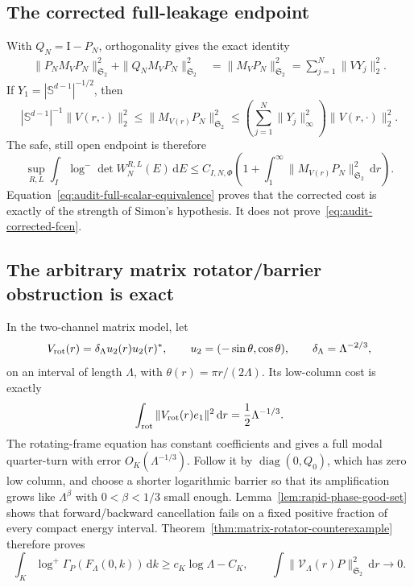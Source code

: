 \documentclass[11pt]{article}
\newcommand{\Sd}{\mathbb S^{d-1}}
\newcommand{\HS}{\mathfrak S_2}
\newcommand{\Id}{\mathrm I}
\newcommand{\dd}{\,\mathrm d}
\DeclareMathOperator{\diag}{diag}
\theoremstyle{definition}
\theoremstyle{remark}
\begin{document}
\subsection{The corrected full-leakage endpoint}

With $Q_N=\Id-P_N$, orthogonality gives the exact identity
\begin{align}
 \|P_NM_VP_N\|_{\HS}^2+\|Q_NM_VP_N\|_{\HS}^2
 &=\|M_VP_N\|_{\HS}^2
 =\sum_{j=1}^N\|VY_j\|_2^2.
 \label{eq:audit-full-leakage}
\end{align}
If $Y_1=|\Sd|^{-1/2}$, then
\begin{equation}
 |\Sd|^{-1}\|V(r,\cdot)\|_2^2
 \leq\|M_{V(r)}P_N\|_{\HS}^2
 \leq\left(\sum_{j=1}^N\|Y_j\|_\infty^2\right)
 \|V(r,\cdot)\|_2^2.
 \label{eq:audit-full-scalar-equivalence}
\end{equation}
The safe, still open endpoint is therefore
\begin{equation}
 \sup_{R,L}\int_I\log^-\det W_N^{R,L}(E)\dd E
 \leq C_{I,N,\Phi}
 \left(1+\int_1^\infty\|M_{V(r)}P_N\|_{\HS}^2\dd r\right).
 \label{eq:audit-corrected-fcen}
\end{equation}
Equation~\eqref{eq:audit-full-scalar-equivalence} proves that the corrected cost is exactly of the strength of Simon's hypothesis.  It does not prove~\eqref{eq:audit-corrected-fcen}.

\subsection{The arbitrary matrix rotator/barrier obstruction is exact}

In the two-channel matrix model, let
\begin{equation}
 V_{\rm rot}(r)=\delta_\Lambda u_2(r)u_2(r)^*,
 \qquad
 u_2=(-\sin\theta,\cos\theta),
 \qquad
 \delta_\Lambda=\Lambda^{-2/3},
 \label{eq:audit-rotator}
\end{equation}
on an interval of length $\Lambda$, with
$\theta(r)=\pi r/(2\Lambda)$.  Its low-column cost is exactly
\begin{equation}
 \int_{\rm rot}\|V_{\rm rot}(r)e_1\|^2\dd r
 =\frac12\Lambda^{-1/3}.
 \label{eq:audit-rotator-cost}
\end{equation}
The rotating-frame equation has constant coefficients and gives a full modal
quarter-turn with error $O_K(\Lambda^{-1/3})$.  Follow it by
$\diag(0,Q_0)$, which has zero low column, and choose a shorter logarithmic
barrier so that its amplification grows like $\Lambda^\beta$ with
$0<\beta<1/3$ small enough.  Lemma~\ref{lem:rapid-phase-good-set} shows that
forward/backward cancellation fails on a fixed positive fraction of every
compact energy interval.  Theorem~\ref{thm:matrix-rotator-counterexample}
therefore proves
\begin{equation}
 \int_K\log^+\Gamma_P(F_\Lambda(0,k))\dd k
 \geq c_K\log\Lambda-C_K,
 \qquad
 \int\|\mathcal V_\Lambda(r)P\|_{\HS}^2\dd r\longrightarrow0.
 \label{eq:audit-matrix-rotator-failure}
\end{equation}
\end{document}
